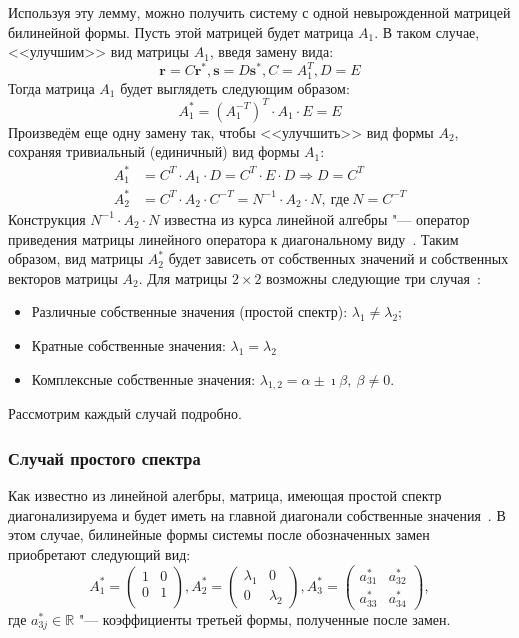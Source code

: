 Используя эту лемму, можно получить систему с одной невырожденной матрицей 
билинейной формы. Пусть этой матрицей будет матрица $A_1$. В таком случае, <<улучшим>> вид 
матрицы $A_1$, введя замену вида: 
$$
	\mathbf{r} = C\mathbf{r}^*, \mathbf{s} = D\mathbf{s}^*, C = A_1^T, D = E
$$
Тогда матрица $A_1$ будет выглядеть следующим образом: 
$$ 
	A_1^* = (A_1^{-T})^T \cdot A_1 \cdot E = E
$$
Произведём еще одну замену так, чтобы <<улучшить>> вид формы $A_2$, сохраняя тривиальный 
(единичный) вид формы $A_1$:
\begin{align*}
	A_1^* & = C^T \cdot A_1 \cdot D = C^T \cdot E \cdot D \Rightarrow D = C^T \\
	A_2^* & = C^T \cdot A_2 \cdot C^{-T} = N^{-1} \cdot A_2 \cdot N,~\text{где}~N=C^{-T}
\end{align*}
Конструкция $N^{-1} \cdot A_2 \cdot N$ известна из курса линейной алгебры "--- оператор 
приведения матрицы линейного оператора к диагональному виду~\cite{costrikin_va2}. Таким образом, вид матрицы $A_2^*$ будет зависеть от собственных значений и собственных векторов матрицы $A_2$. Для матрицы $2 \times 2$ возможны следующие три случая~\cite{tyrtyshnikov_ma}: 
\begin{itemize}
	\item Различные собственные значения (простой спектр): $\lambda_1 \ne \lambda_2$;
	\item Кратные собственные значения: $\lambda_1 = \lambda_2$
	\item Комплексные собственные значения: $\lambda_{1,2} = \alpha \pm \imath \beta,~\beta 
	\ne 0$.
\end{itemize}
Рассмотрим каждый случай подробно. 

\subsubsection{Случай простого спектра}
Как известно из линейной алегбры, матрица, имеющая простой спектр диагонализируема и будет 
иметь на главной диагонали собственные значения~\cite{costrikin_va2}. В этом случае, билинейные формы системы после обозначенных замен приобретают следующий вид: 
\begin{equation}\label{eq:simple_raw}
	A^*_1 = 
	\begin{pmatrix}
		1 & 0 \\
		0 & 1 \\
	\end{pmatrix}, 
	A^*_2 = 
	\begin{pmatrix}
		\lambda_1 & 0 \\
		0 & \lambda_2
 	\end{pmatrix},
	A^*_3 = 
	\begin{pmatrix}
		a^*_{31} & a^*_{32} \\
		a^*_{33} & a^*_{34}
	\end{pmatrix},
\end{equation} 
где $a^*_{3 j} \in \mathbb{R}$ "--- коэффициенты третьей формы, полученные после замен.

